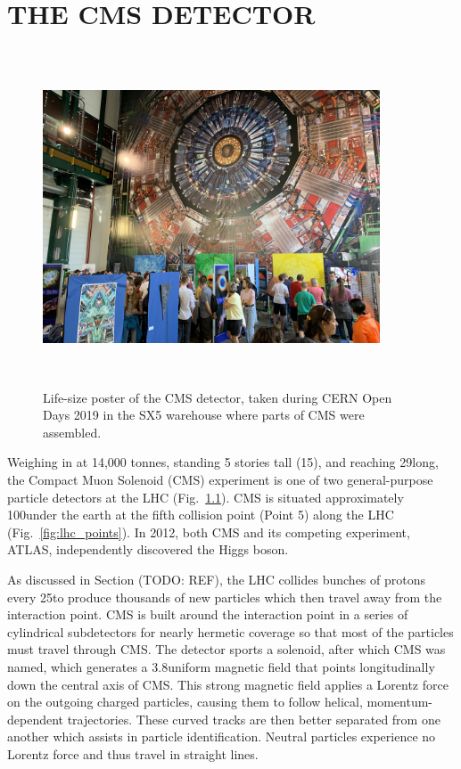 \chapter{THE CMS DETECTOR} 
\label{ch:cms_detector}
\begin{figure}[pbth]
\centering
\includegraphics[width=10cm,height=10cm,keepaspectratio]{figures/cms/cms_poster_SX5.jpg}
    \caption{
    Life-size poster of the CMS detector, taken during CERN Open Days 2019
    in the SX5 warehouse where parts of CMS were assembled.}
    \label{fig:cms_poster}
\end{figure}
Weighing in at 14,000 tonnes, standing 5 stories tall (15\meter), and reaching 29\meter long, the Compact Muon Solenoid (CMS) experiment is one of two general-purpose particle detectors at the LHC (Fig.~\ref{fig:cms_poster}).
CMS is situated approximately 100\meter under the earth at the fifth collision point (Point 5) along the LHC (Fig.~\ref{fig:lhc_points}).
In 2012, both CMS and its competing experiment, ATLAS, independently discovered the Higgs boson.

As discussed in Section (TODO: REF), the LHC collides bunches of protons every 25\ns to produce thousands of new particles which then travel away from the interaction point.
CMS is built around the interaction point in a series of cylindrical subdetectors for nearly hermetic coverage so that most of the particles must travel through CMS.
The detector sports a solenoid, after which CMS was named, which generates a 3.8\tesla uniform magnetic field that points longitudinally down the central axis of CMS.
This strong magnetic field applies a Lorentz force on the outgoing charged particles, causing them to follow helical, momentum-dependent trajectories.
These curved tracks are then better separated from one another which assists in particle identification.
Neutral particles experience no Lorentz force and thus travel in straight lines.


